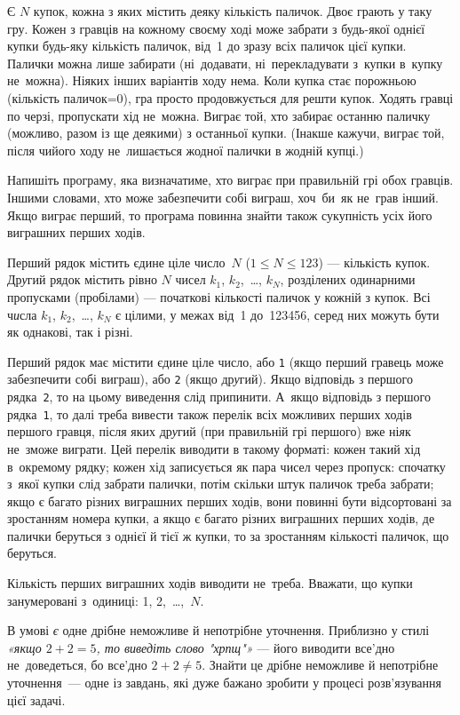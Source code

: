 ﻿Є $N$ купок, кожна з яких містить деяку кількість паличок.
Двоє грають у таку гру.
Кожен з гравців на кожному своєму ході може забрати з будь-якої однієї купки будь-яку кількість паличок, від~1 до зразу всіх паличок цієї купки. Палички можна лише забирати (ні~додавати, ні~перекладувати з~купки в~купку не~можна).
Ніяких інших варіантів ходу нема. 
Коли купка стає порожньою (кількість паличок=0), гра просто продовжується для решти купок.
Ходять гравці по черзі, пропускати хід не~можна.
Виграє той, хто забирає останню паличку (можливо, разом із ще деякими) з останньої купки.
(Інакше кажучи, виграє той, після чийого ходу не~лишається жодної палички в жодній купці.)

Напишіть програму, яка визначатиме, хто виграє при правильній грі обох гравців. 
Іншими словами, хто може забезпечити собі виграш, хоч~би~як не~грав інший.
Якщо виграє перший, то програма повинна знайти також сукупність усіх його виграшних перших ходів.

\InputFile
Перший рядок містить єдине ціле число~$N$ ($1\leqslant N\leqslant 123$) --- кількість купок.
Др{\it у}гий рядок містить рівно $N$ чисел $k_1$, $k_2$,~\dots, $k_N$, розділених одинарними пропусками (пробілами) --- початкові кількості паличок у кожній з купок. Всі ч{\it и}сла $k_1$, $k_2$,~\dots, $k_N$ є цілими, у межах від~1 до~123456, серед них можуть бути як однакові, так і різні.

\OutputFile
Перший рядок має містити єдине ціле число, або \texttt{1} (якщо перший гравець може забезпечити собі виграш), або \texttt{2} (якщо др{\it у}гий).
Якщо відповідь з першого рядка~\texttt{2}, то на цьому виведення слід припинити. А~якщо відповідь з першого рядка~\texttt{1}, то далі треба вивести також перелік всіх можливих перших ходів першого гравця, після яких др{\it у}гий (при правильній грі першого) вже ні{\it я}к не~зможе виграти. Цей перелік виводити в такому форматі: кожен такий хід в~окремому рядку; кожен хід записується як пара чисел через пропуск: спочатку з~якої купки слід забрати палички, потім скільки штук паличок треба забрати; якщо є багато різних виграшних перших ходів, вони повинні бути відсортовані за зростанням номера купки, а якщо є багато різних виграшних перших ходів, де палички беруться з однієї й тієї ж купки, то за зростанням кількості паличок, що беруться.

Кількість перших виграшних ходів виводити не~треба.
Вважати, що купки занумеровані з~одиниці: 1, 2,~\dots,~$N$.

\Examples

\begin{example}
\end{example}

\Note
В умові {\it є} одне дрібне неможливе й непотрібне уточнення. Приблизно у стилі {\it «якщо $2+2=5$, то виведіть слово "хрпщ"»} --- його виводити все'дно не~доведеться, бо все'дно $2+2\neq 5$. Знайти це дрібне неможливе й непотрібне уточнення~--- одне із завдань, які дуже бажано зробити у процесі розв'язування цієї задачі.
